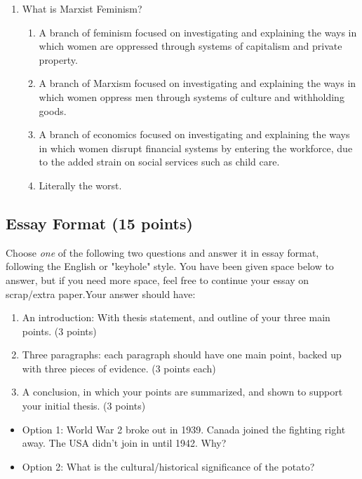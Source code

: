 \documentclass[11pt]{exam}
\begin{document}
\begin{questions}
\begin{enumerate}
\item What is Marxist Feminism?

\begin{enumerate}
\item A branch of feminism focused on investigating and explaining the ways in which women
are oppressed through systems of capitalism and private property.
\item A branch of Marxism focused on investigating and explaining the ways in which women
oppress men through systems of culture and withholding goods.
\item A branch of economics focused on investigating and explaining the ways in which
women disrupt financial systems by entering the workforce, due to the added strain on
social services such as child care.
\item Literally the worst.
\end{enumerate}



\end{enumerate}

\newpage
\subsection{Essay Format (15 points)}
\setcounter{question}{0}
\question Choose \emph{one} of the following two questions and answer it in essay format, following the English or "keyhole" style. You have been given space below to answer, but if you need more space, feel free to continue your essay on scrap/extra paper.Your answer should have:
\begin{enumerate}
\item An introduction: With thesis statement, and outline of your three main points. (3 points)
\item Three paragraphs: each paragraph should have one main point, backed up with three pieces of evidence. (3 points each)
\item A conclusion, in which your points are summarized, and shown to support your initial thesis. (3 points)

\end{enumerate}
\begin{itemize}
\item Option 1: World War 2 broke out in 1939. Canada joined the fighting right away. The USA didn’t join in until 1942. Why?
\item Option 2: What is the cultural/historical significance of the potato?
\end{itemize}
\vfill


\end{questions}
\end{document}
